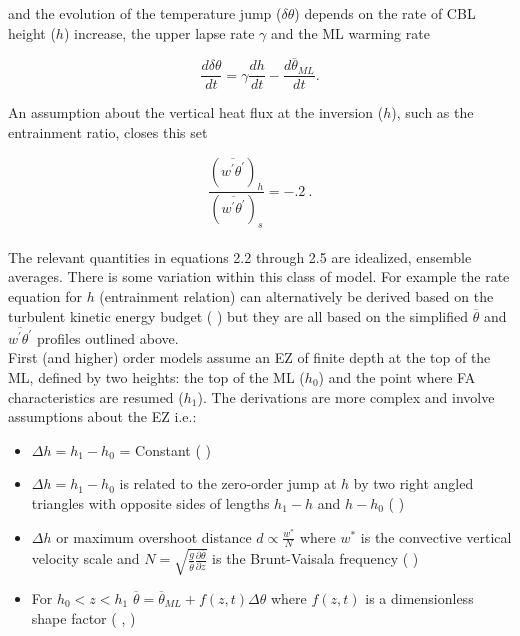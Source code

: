 and the evolution of the temperature jump ($\delta \theta$) depends on the rate of \acs{CBL} height ($h$) increase, the upper lapse rate $\gamma$ and the \acs{ML} warming rate
  
\begin{equation}
\frac{d\delta \theta}{dt} = \gamma\frac{dh}{dt} - \frac{d\overline{\theta}_{ML}}{dt}.
\end{equation}

An assumption about the vertical heat flux at the inversion ($h$), such as the entrainment ratio, closes this set

\begin{equation}
\frac{(\overline{w^{'}\theta^{'}})_{h}}{(\overline{w^{'}\theta^{'}})_{s}} = -.2 \ .
\end{equation}\\

The relevant quantities in equations 2.2 through 2.5 are idealized, ensemble averages. There is some variation within this class of model.  For example the rate equation for $h$ (entrainment relation) can alternatively be derived based on the turbulent kinetic energy budget (\citeauthor{FedConzMir04} \citeyear{FedConzMir04}) but they are all based on the simplified $\overline{\theta}$ and $\overline{w^{'}\theta^{'}}$ profiles outlined above.\\  

First (and higher) order models assume an \acs{EZ} of finite depth at the top of the ML, defined by two heights:  the top of the ML ($h_{0}$) and the point where \acs{FA} characteristics are resumed ($h_{1}$).  The derivations are more complex and involve assumptions about the \acs{EZ} i.e.: 

\begin{itemize}
\item{$\Delta h = h_{1} - h_{0}$ = Constant (\citeauthor{Betts74} \citeyear{Betts74})}

\item{$\Delta h = h_{1} - h_{0}$ is related to the zero-order jump at $h$ by two right angled triangles with opposite sides
of lengths $h_{1} - h$ and $h - h_{0}$ (\citeauthor{BatchGryn} \citeyear{BatchGryn})}

\item{$\Delta h$ or maximum overshoot distance $d \propto \frac{w^{*}}{N}$ where $w^{*}$ is the convective vertical velocity scale and $N = \sqrt{\frac{g}{\overline{\theta}} \frac{\partial \overline{\theta}}{\partial z}}$ is the Brunt-Vaisala frequency (\citeauthor{Stull73} \citeyear{Stull73})}
 
\item{For $h_{0}<z<h_{1}$ $\overline{\theta} = \overline{\theta}_{ML} + f(z,t) \Delta \theta$ where $f(z,t)$ is a dimensionless shape factor (\citeauthor{Deardorff79} \citeyear{Deardorff79}, \citeauthor{FedConzMir04} \citeyear{FedConzMir04})}
\end{itemize}
 \\


